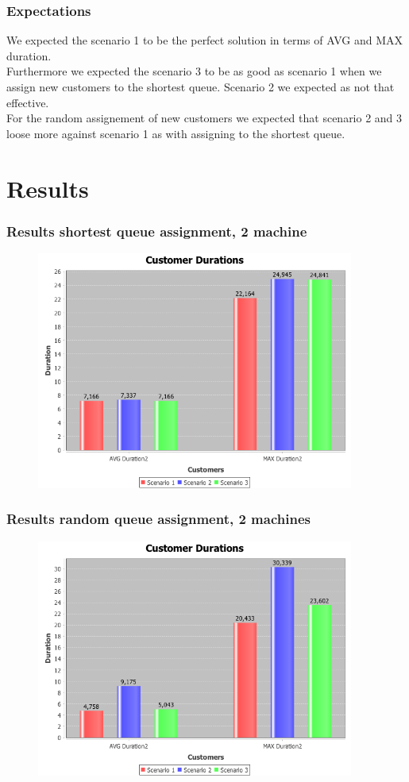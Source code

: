 \documentclass{beamer}
\begin{document}
\begin{frame}
\frametitle{Expectations}
We expected the scenario 1 to be the perfect solution in terms of AVG and MAX duration.\\
Furthermore we expected the scenario 3 to be as good as scenario 1 when we assign new customers to the shortest queue. Scenario 2 we expected as not that effective. \\
For the random assignement of new customers we expected that scenario 2 and 3 loose more against scenario 1 as with assigning to the shortest queue.
\end{frame}

\section{Results}
\begin{frame}
\frametitle{Results shortest queue assignment, 2 machine}
\begin{figure}
\centering
\includegraphics[width=0.93\textwidth]{results/out_2_random_false.png}
\end{figure}
\end{frame}

\begin{frame}
\frametitle{Results random queue assignment, 2 machines}
\begin{figure}
\centering
\includegraphics[width=0.93\textwidth]{results/out_2_random_true.png}
\end{figure}
\end{frame}
\end{document}

